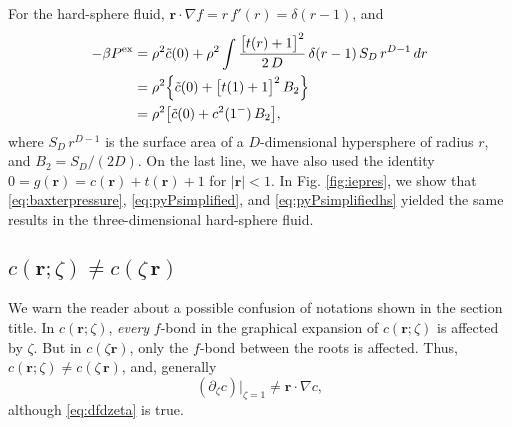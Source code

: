 \documentclass[preprint]{revtex4-1}
\newcommand{\vct}[1]{\mathbf{#1}}
\providecommand{\vr}{} %
\renewcommand{\vr}{\vct{r}}
\newcommand{\supex}[1]{ { { #1 }^{ \mathrm{ex} } } }
\newcommand{\Pex}{\supex{P}}
\begin{document}
For the hard-sphere fluid,
$\vr \cdot \nabla f = r \, f'(r) = \delta(r - 1)$, and
\begin{align}
  -\beta \Pex
&=
  \rho^2 \tilde{c}(0)
  +
  \rho^2 \int
    \frac{ \big[ t(r) + 1 \big]^2 }
         { 2 \, D }
  \, \delta(r - 1)
  \, S_D \, r^{D-1} \, dr
\notag
\\
&=
  \rho^2
  \Bigl\{
    \tilde{c}(0)
  +
  \big[ t(1) + 1 \big]^2 \, B_2
  \Bigr\}
\notag \\
&=
  \rho^2
  \bigl[
    \tilde{c}(0)
  +
    c^2(1^-) \, B_2
  \bigr],
  \label{eq:pyPsimplifiedhs}
\end{align}
%
where
$S_D \, r^{D-1}$ is the surface area of a $D$-dimensional hypersphere of radius $r$,
and $B_2 = S_D / (2D)$.
%
On the last line, we have also used the identity
$0 = g(\vr) = c(\vr) + t(\vr) + 1$
for $|\vr| < 1$.
%
In Fig. \ref{fig:iepres},
we show that
\eqref{eq:baxterpressure},
\eqref{eq:pyPsimplified},
and
\eqref{eq:pyPsimplifiedhs}
yielded the same results
in the three-dimensional hard-sphere fluid.



\subsection{$c(\vr; \zeta) \ne c(\zeta \, \vr)$}


We warn the reader about a possible confusion of notations
shown in the section title.
%
In $c(\vr; \zeta)$,
\emph{every} $f$-bond
in the graphical expansion of $c(\vr; \zeta)$
is affected by $\zeta$.
%
But in $c(\zeta \vr)$,
only the $f$-bond between the roots is affected.
%
Thus,
$c(\vr; \zeta) \ne c(\zeta \, \vr)$,
and, generally
\[
  (\partial_\zeta c) \big|_{\zeta = 1}
\ne
  \vr \cdot \nabla c,
\]
although \eqref{eq:dfdzeta} is true.
%
\end{document}
